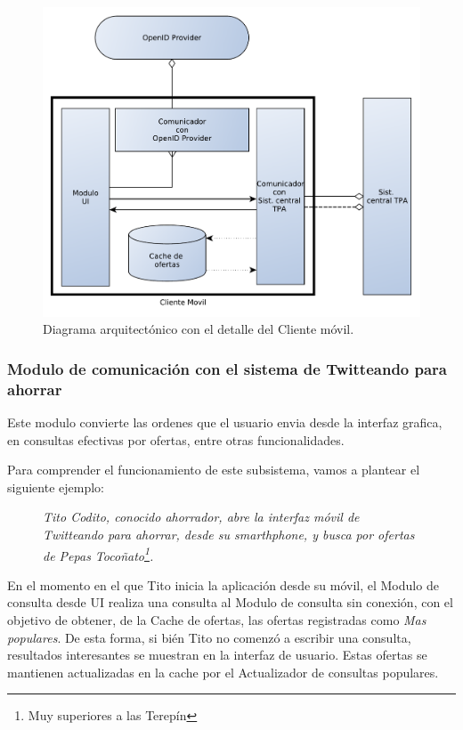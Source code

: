 \begin{figure}[H]
	\centering
	\includegraphics[width=\textwidth]{graficos/arch/Cliente_movil.pdf}
	\caption{Diagrama arquitectónico con el detalle del \textsf{Cliente móvil}.}
\end{figure}

\subsubsection{Modulo de comunicación con el sistema de Twitteando para ahorrar}

Este modulo convierte las ordenes que el usuario envia desde la interfaz grafica, en consultas efectivas por ofertas, entre otras funcionalidades. 

Para comprender el funcionamiento de este subsistema, vamos a plantear el siguiente ejemplo:

\begin{figure}[H]
	\centering
	\emph{Tito Codito, conocido ahorrador, abre la interfaz móvil de Twitteando para ahorrar, desde su smarthphone, y busca por ofertas de \emph{Pepas Tocoñato}\footnote{Muy superiores a las Terepín}.}
\end{figure}

En el momento en el que Tito inicia la aplicación desde su móvil, el \textsf{Modulo de consulta desde UI} realiza una consulta al \textsf{Modulo de consulta sin conexión}, con el objetivo de obtener, de la \textsf{Cache de ofertas}, las ofertas registradas como \emph{Mas populares}. De esta forma, si bién Tito no comenzó a escribir una consulta, resultados interesantes se muestran en la interfaz de usuario. Estas ofertas se mantienen actualizadas en la cache por el \textsf{Actualizador de consultas populares}.

